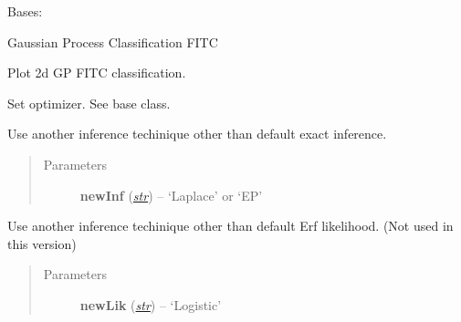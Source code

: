 \documentclass[letterpaper,10pt,english]{sphinxmanual}
\begin{document}

\begin{fulllineitems}
\label{pyGPs.Core:pyGPs.Core.gp.GPC_FITC}
Bases: {\hyperref[pyGPs.Core:pyGPs.Core.gp.GP_FITC]{}}

Gaussian Process Classification FITC

\begin{fulllineitems}
\label{pyGPs.Core:pyGPs.Core.gp.GPC_FITC.plot}
Plot 2d GP FITC classification.

\end{fulllineitems}


\begin{fulllineitems}
\label{pyGPs.Core:pyGPs.Core.gp.GPC_FITC.setOptimizer}
Set optimizer. See base class.

\end{fulllineitems}


\begin{fulllineitems}
\label{pyGPs.Core:pyGPs.Core.gp.GPC_FITC.useInference}
Use another inference techinique other than default exact inference.
\begin{quote}\begin{description}
\item[{Parameters}] \leavevmode
\textbf{newInf} (\href{http://docs.python.org/library/functions.html\#str}{\emph{str}}) -- `Laplace' or `EP'

\end{description}\end{quote}

\end{fulllineitems}


\begin{fulllineitems}
\label{pyGPs.Core:pyGPs.Core.gp.GPC_FITC.useLikelihood}
Use another inference techinique other than default Erf likelihood.
(Not used in this version)
\begin{quote}\begin{description}
\item[{Parameters}] \leavevmode
\textbf{newLik} (\href{http://docs.python.org/library/functions.html\#str}{\emph{str}}) -- `Logistic'


\end{description}
\end{quote}
\end{fulllineitems}
\end{fulllineitems}
\end{document}
